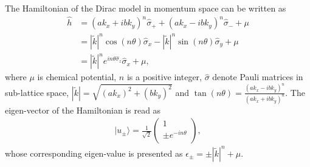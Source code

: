 \documentclass{article}
\begin{document}
The Hamiltonian of the Dirac model in momentum space can be written as 
\begin{align}
    \hat{h} &= \left(a k_x + ib k_y\right)^n \hat{\sigma}_+ + \left(a k_x - ib k_y\right)^n \hat{\sigma}_- + \mu \\
            &= |\widetilde{k}|^n \cos(n \theta) \hat{\sigma}_x - |\widetilde{k}|^n \sin(n \theta) \hat{\sigma}_y + \mu\\
            &= |\widetilde{k}|^n e^{in \theta \hat{\sigma}_z}\hat{\sigma}_x + \mu,  
\end{align}
where $ \mu $ is chemical potential, $ n $ is a positive integer, $ \hat{\sigma} $ denote Pauli matrices in sub-lattice space, $ |\widetilde{k}|= \sqrt{(a k_x)^2 + (b k_y)^2 }   $ and $ \tan(n \theta) = \frac{(ak_x-ibk_y)^n}{(ak_x+ibk_y)^n} $. The eigen-vector of the Hamiltonian is read as 
\begin{align}
    |u_\pm\rangle = \frac{1}{\sqrt{2} } \left(\begin{array}{c}
         1 \\
         \pm e^{-in \theta} \\
    \end{array}\right),
\end{align}
whose corresponding eigen-value is presented as $ \epsilon_{\pm} = \pm |\widetilde{k}|^n + \mu   $. 
\end{document}
